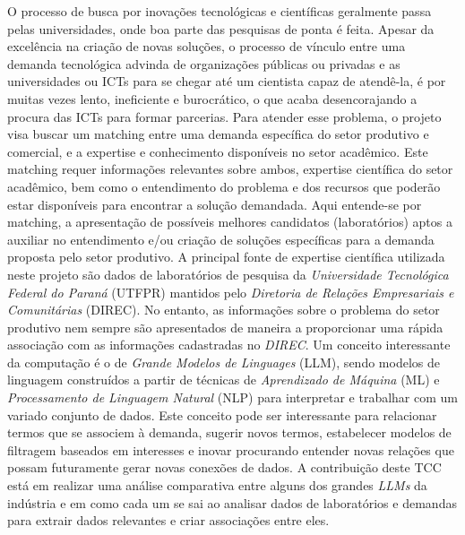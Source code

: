 \begin{resumoutfpr}
    O processo de busca por inovações tecnológicas e científicas geralmente passa pelas universidades, onde boa parte das pesquisas de ponta é feita. Apesar da excelência na criação de novas soluções, o processo de vínculo entre uma demanda tecnológica advinda de organizações públicas ou privadas e as universidades ou ICTs para se chegar até um cientista capaz de atendê-la, é por muitas vezes lento, ineficiente e burocrático, o que acaba desencorajando a procura das ICTs para formar parcerias. Para atender esse problema, o projeto visa buscar um matching entre uma demanda específica do setor produtivo e comercial, e a expertise e conhecimento disponíveis no setor acadêmico. Este matching requer informações relevantes sobre ambos, expertise científica do setor acadêmico, bem como o entendimento do problema e dos recursos que poderão estar disponíveis para encontrar a solução demandada. Aqui entende-se por matching, a apresentação de possíveis melhores candidatos (laboratórios) aptos a auxiliar no entendimento e/ou criação de soluções específicas para a demanda proposta pelo setor produtivo. A principal fonte de expertise científica utilizada neste projeto são dados de laboratórios de pesquisa da \emph{Universidade Tecnológica Federal do Paraná} (UTFPR) mantidos pelo \emph{Diretoria de Relações Empresariais e Comunitárias} (DIREC). No entanto, as informações sobre o problema do setor produtivo nem sempre são apresentados de maneira a proporcionar uma rápida associação com as informações cadastradas no \emph{DIREC}.
    Um conceito interessante da computação é o de \emph{Grande Modelos de Linguages} (LLM), sendo modelos de linguagem construídos a partir de técnicas de \emph{Aprendizado de Máquina} (ML) e \emph{Processamento de Linguagem Natural} (NLP) para interpretar e trabalhar com um variado conjunto de dados. Este conceito pode ser interessante para relacionar termos que se associem à demanda, sugerir novos termos, estabelecer modelos de filtragem baseados em interesses e inovar procurando entender novas relações que possam futuramente gerar novas conexões de dados. A contribuição deste TCC está em realizar uma análise comparativa entre alguns dos grandes \emph{LLMs} da indústria e em como cada um se sai ao analisar dados de laboratórios e demandas para extrair dados relevantes e criar associações entre eles.
\end{resumoutfpr}